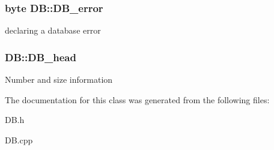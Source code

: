 \subsubsection[{D\+B\+\_\+error}]{\setlength{\rightskip}{0pt plus 5cm}byte D\+B\+::\+D\+B\+\_\+error}\label{class_d_b_aca26334e18510737d4a41784e28f1ccf}
declaring a database error \hypertarget{class_d_b_af0a8ae34154ce61be580fd63c265ec2d}{}
\subsubsection[{D\+B\+\_\+head}]{ D\+B\+::\+D\+B\+\_\+head}\label{class_d_b_af0a8ae34154ce61be580fd63c265ec2d}
Number and size information 

The documentation for this class was generated from the following files\+:\begin{DoxyCompactItemize}
\item 
D\+B.\+h\item 
D\+B.\+cpp\end{DoxyCompactItemize}
